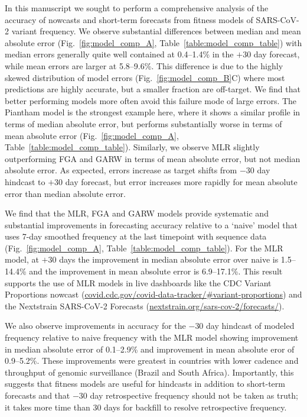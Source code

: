 \documentclass[11pt,oneside,letterpaper]{article}
\begin{document}
In this manuscript we sought to perform a comprehensive analysis of the accuracy of nowcasts and short-term forecasts from fitness models of SARS-CoV-2 variant frequency.
We observe substantial differences between median and mean absolute error (Fig.~\ref{fig:model_comp_A}, Table~\ref{table:model_comp_table}) with median errors generally quite well contained at 0.4--1.4\% in the $+30$ day forecast, while mean errors are larger at 5.8--9.6\%.
This difference is due to the highly skewed distribution of model errors (Fig.~\ref{fig:model_comp_B}C) where most predictions are highly accurate, but a smaller fraction are off-target.
We find that better performing models more often avoid this failure mode of large errors.
The Piantham \cite{piantham2021estimating} model is the strongest example here, where it shows a similar profile in terms of median absolute error, but performs substantially worse in terms of mean absolute error (Fig.~\ref{fig:model_comp_A}, Table~\ref{table:model_comp_table}).
Similarly, we observe MLR slightly outperforming FGA and GARW \cite{figgins2022sars} in terms of mean absolute error, but not median absolute error.
As expected, errors increase as target shifts from $-30$ day hindcast to $+30$ day forecast, but error increases more rapidly for mean absolute error than median absolute error.


\sloppy %
We find that the MLR, FGA and GARW models provide systematic and substantial improvements in forecasting accuracy relative to a `naive' model that uses 7-day smoothed frequency at the last timepoint with sequence data (Fig.~\ref{fig:model_comp_A}, Table~\ref{table:model_comp_table}).
For the MLR model, at $+30$ days the improvement in median absolute error over naive is 1.5--14.4\% and the improvement in mean absolute error is 6.9--17.1\%.
This result supports the use of MLR models in live dashboards like the CDC Variant Proportions nowcast (\href{https://covid.cdc.gov/covid-data-tracker/\#variant-proportions}{covid.cdc.gov/covid-data-tracker/\#variant-proportions}) and the Nextstrain SARS-CoV-2 Forecasts (\href{https://nextstrain.org/sars-cov-2/forecasts/}{nextstrain.org/sars-cov-2/forecasts/}).

We also observe improvements in accuracy for the $-30$ day hindcast of modeled frequency relative to naive frequency with the MLR model showing improvement in median absolute error of 0.1--2.9\% and improvement in mean absolute eror of 0.9--5.2\%.
These improvements were greatest in countries with lower cadence and throughput of genomic surveillance (Brazil and South Africa).
Importantly, this suggests that fitness models are useful for hindcasts in addition to short-term forecasts and that $-30$ day retrospective frequency should not be taken as truth; it takes more time than 30 days for backfill to resolve retrospective frequency.
\end{document}
